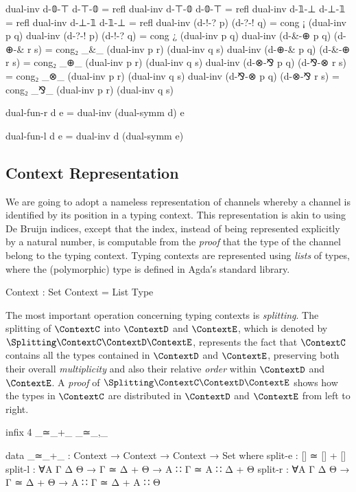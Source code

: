 \begin{code}[hide]
dual-inv d-𝟘-⊤ d-⊤-𝟘 = refl
dual-inv d-⊤-𝟘 d-𝟘-⊤ = refl
dual-inv d-𝟙-⊥ d-⊥-𝟙 = refl
dual-inv d-⊥-𝟙 d-𝟙-⊥ = refl
dual-inv (d-!-? p) (d-?-! q) = cong ¡ (dual-inv p q)
dual-inv (d-?-! p) (d-!-? q) = cong ¿ (dual-inv p q)
dual-inv (d-&-⊕ p q) (d-⊕-& r s) = cong₂ _&_ (dual-inv p r) (dual-inv q s)
dual-inv (d-⊕-& p q) (d-&-⊕ r s) = cong₂ _⊕_ (dual-inv p r) (dual-inv q s)
dual-inv (d-⊗-⅋ p q) (d-⅋-⊗ r s) = cong₂ _⊗_ (dual-inv p r) (dual-inv q s)
dual-inv (d-⅋-⊗ p q) (d-⊗-⅋ r s) = cong₂ _⅋_ (dual-inv p r) (dual-inv q s)

dual-fun-r d e = dual-inv (dual-symm d) e

dual-fun-l d e = dual-inv d (dual-symm e)
\end{code}

\subsection{Context Representation}
\label{sec:context-agda}

We are going to adopt a nameless representation of channels whereby a channel is
identified by its position in a typing context. This representation is akin to
using De Bruijn indices, except that the index, instead of being represented
explicitly by a natural number, is computable from the \emph{proof} that the
type of the channel belong to the typing context.
%
Typing contexts are represented using \emph{lists} of types, where the
(polymorphic)  type is defined in Agda′s standard library.

\begin{code}
Context : Set
Context = List Type
\end{code}

The most important operation concerning typing contexts is \emph{splitting}. The
splitting of $\ContextC$ into $\ContextD$ and $\ContextE$, which is denoted by
$\Splitting\ContextC\ContextD\ContextE$, represents the fact that $\ContextC$
contains all the types contained in $\ContextD$ and $\ContextE$, preserving both
their overall \emph{multiplicity} and also their relative \emph{order} within
$\ContextD$ and $\ContextE$. A \emph{proof} of
$\Splitting\ContextC\ContextD\ContextE$ shows how the types in $\ContextC$ are
distributed in $\ContextD$ and $\ContextE$ from left to right.

\begin{code}[hide]
infix 4 _≃_+_ _≃_,_
\end{code}
\begin{code}
data _≃_+_ : Context → Context → Context → Set where
  split-e  : [] ≃ [] + []
  split-l  : ∀{A Γ Δ Θ} → Γ ≃ Δ + Θ → A ∷ Γ ≃ A ∷ Δ + Θ
  split-r  : ∀{A Γ Δ Θ} → Γ ≃ Δ + Θ → A ∷ Γ ≃ Δ + A ∷ Θ
\end{code}

